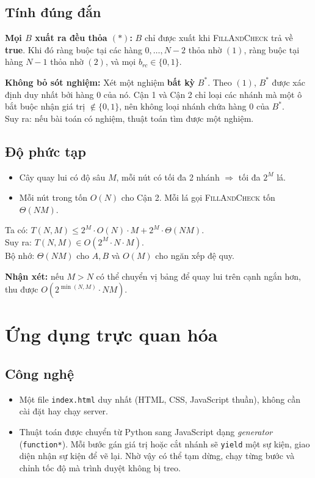 \documentclass[12pt,a4paper]{article}
\begin{document}
\subsection{Tính đúng đắn}
\textbf{Mọi $B$ xuất ra đều thỏa $(\ast)$:} $B$ chỉ được xuất khi \textsc{FillAndCheck} trả về \textbf{true}. Khi đó ràng buộc tại các hàng $0, \dots, N-2$ thỏa nhờ $(1)$, ràng buộc tại hàng $N-1$ thỏa nhờ $(2)$, và mọi $b_{rc} \in \{0, 1\}$.

\noindent\textbf{Không bỏ sót nghiệm:} Xét một nghiệm \textbf{bất kỳ} $B^*$. Theo $(1)$, $B^*$ được xác định duy nhất bởi hàng $0$ của nó. Cận 1 và Cận 2 chỉ loại các nhánh mà một ô bắt buộc nhận giá trị $\notin \{0, 1\}$, nên không loại nhánh chứa hàng $0$ của $B^*$. \\
Suy ra: nếu bài toán có nghiệm, thuật toán tìm được một nghiệm.

\subsection{Độ phức tạp}
\begin{itemize}
    \item Cây quay lui có độ sâu $M$, mỗi nút có tối đa 2 nhánh $\Rightarrow$ tối đa $2^M$ lá.
    \item Mỗi nút trong tốn $O(N)$ cho Cận 2. Mỗi lá gọi \textsc{FillAndCheck} tốn $\Theta(NM)$.
\end{itemize}
Ta có: $T(N, M) \le 2^M \cdot O(N) \cdot M + 2^M \cdot \Theta(NM)$. \\
Suy ra: $T(N, M) \in O(2^M \cdot N \cdot M)$. \\
Bộ nhớ: $\Theta(NM)$ cho $A, B$ và $O(M)$ cho ngăn xếp đệ quy.

\noindent\textbf{Nhận xét:} nếu $M > N$ có thể chuyển vị bảng để quay lui trên cạnh ngắn hơn, thu được $O(2^{\min(N,M)} \cdot NM)$.

\section{Ứng dụng trực quan hóa}

\subsection{Công nghệ}
\begin{itemize}
    \item Một file \texttt{index.html} duy nhất (HTML, CSS, JavaScript thuần), không cần cài đặt hay chạy server.
    \item Thuật toán được chuyển từ Python sang JavaScript dạng \textit{generator} (\texttt{function*}). Mỗi bước gán giá trị hoặc cắt nhánh sẽ \texttt{yield} một sự kiện, giao diện nhận sự kiện để vẽ lại. Nhờ vậy có thể tạm dừng, chạy từng bước và chỉnh tốc độ mà trình duyệt không bị treo.
\end{itemize}
\end{document}
